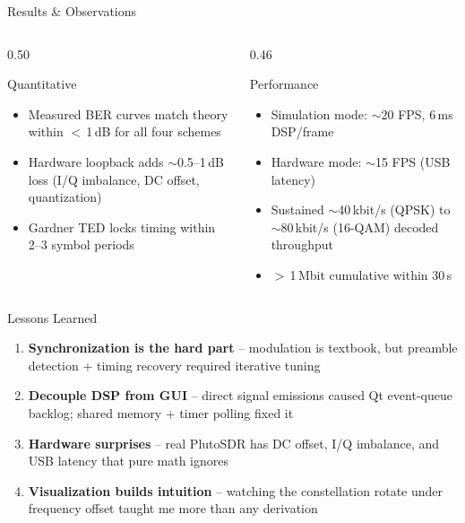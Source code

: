 \documentclass[aspectratio=169, 12pt]{beamer}
\begin{document}
\begin{frame}{Results \& Observations}
\begin{columns}[T]
\begin{column}{0.50\textwidth}
\begin{block}{Quantitative}
\begin{itemize}
    \item Measured BER curves match theory within $<$\,1\,dB for all four schemes
    \item Hardware loopback adds $\sim$0.5--1\,dB loss (I/Q imbalance, DC offset, quantization)
    \item Gardner TED locks timing within 2--3 symbol periods
\end{itemize}
\end{block}
\end{column}
\begin{column}{0.46\textwidth}
\begin{block}{Performance}
\begin{itemize}
    \item Simulation mode: $\sim$20 FPS, 6\,ms DSP/frame
    \item Hardware mode: $\sim$15 FPS (USB latency)
    \item Sustained $\sim$40\,kbit/s (QPSK) to $\sim$80\,kbit/s (16-QAM) decoded throughput
    \item $>$\,1\,Mbit cumulative within 30\,s
\end{itemize}
\end{block}
\end{column}
\end{columns}
\end{frame}

\begin{frame}{Lessons Learned}
\begin{enumerate}
    \item \textbf{Synchronization is the hard part} -- modulation is textbook, but preamble detection + timing recovery required iterative tuning
    \item \textbf{Decouple DSP from GUI} -- direct signal emissions caused Qt event-queue backlog; shared memory + timer polling fixed it
    \item \textbf{Hardware surprises} -- real PlutoSDR has DC offset, I/Q imbalance, and USB latency that pure math ignores
    \item \textbf{Visualization builds intuition} -- watching the constellation rotate under frequency offset taught me more than any derivation
\end{enumerate}
\end{frame}
\end{document}

